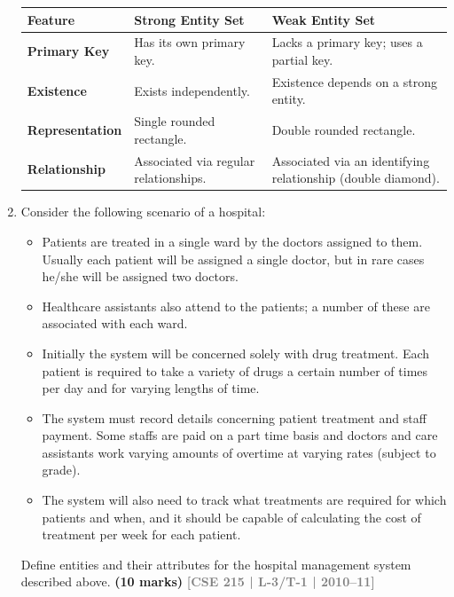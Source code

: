 \documentclass[12pt,a3paper]{article}
\newcommand{\yr}[1]{\hfill\textcolor{gray}{\small\textbf{[#1]}}}
\newcommand{\mk}[1]{\textcolor{orange!70!black}{\small\textbf{(#1 marks)}}}
\begin{document}
\begin{enumerate}
\begin{tcolorbox}[enhanced,breakable,ansbox,colback=cA!4,colframe=cA,boxrule=0.8pt,arc=5pt,title={\textbf{Answer}},fonttitle=\bfseries\color{white},colbacktitle=cA]
\begin{center}
\renewcommand{\arraystretch}{1.3}
\begin{tabular}{@{} l p{6cm} p{6cm} @{}}
\toprule
\textbf{Feature} & \textbf{Strong Entity Set} & \textbf{Weak Entity Set} \\
\midrule
\textbf{Primary Key} & Has its own primary key. & Lacks a primary key; uses a partial key. \\
\textbf{Existence} & Exists independently. & Existence depends on a strong entity. \\
\textbf{Representation} & Single rounded rectangle. & Double rounded rectangle. \\
\textbf{Relationship} & Associated via regular relationships. & Associated via an identifying relationship (double diamond). \\
\bottomrule
\end{tabular}
\end{center}

\end{tcolorbox}

\item Consider the following scenario of a hospital:

\begin{itemize}[leftmargin=1.5em,itemsep=2pt]
  \item Patients are treated in a single ward by the doctors assigned to them. Usually each patient will be assigned a single doctor, but in rare cases he/she will be assigned two doctors.
  \item Healthcare assistants also attend to the patients; a number of these are associated with each ward.
  \item Initially the system will be concerned solely with drug treatment. Each patient is required to take a variety of drugs a certain number of times per day and for varying lengths of time.
  \item The system must record details concerning patient treatment and staff payment. Some staffs are paid on a part time basis and doctors and care assistants work varying amounts of overtime at varying rates (subject to grade).
  \item The system will also need to track what treatments are required for which patients and when, and it should be capable of calculating the cost of treatment per week for each patient.
\end{itemize}

Define entities and their attributes for the hospital management system described above.
\mk{10} \yr{CSE 215 | L-3/T-1 | 2010--11}


\end{enumerate}
\end{document}
